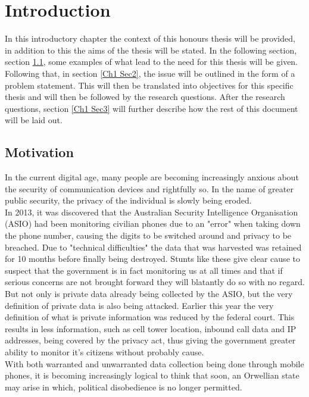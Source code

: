 
\chapter{Introduction} %

\label{Chapter 1} %

In this introductory chapter the context of this honours thesis will be provided, in addition to this the aims of the thesis will be stated. In the following section, section \ref{Ch1 Sec1}, some examples of what lead to the need for this thesis will be given. Following that, in section \ref{Ch1 Sec2}, the issue will be outlined in the form of a problem statement. This will then be translated into objectives for this specific thesis and will then be followed by the research questions. After the research questions, section \ref{Ch1 Sec3} will further describe how the rest of this document will be laid out.   


\section{Motivation}

\label{Ch1 Sec1}

In the current digital age, many people are becoming increasingly anxious about the security of communication devices and rightfully so. In the name of greater public security, the privacy of the individual is slowly being eroded.\\
In 2013, it was discovered that the Australian Security Intelligence Organisation (ASIO) had been monitoring civilian phones due to an "error" when taking down the phone number, causing the digits to be switched around and privacy to be breached. Due to "technical difficulties" the data that was harvested was retained for 10 months before finally being destroyed.\cite{Reference36} Stunts like these give clear cause to suspect that the government is in fact monitoring us at all times and that if serious concerns are not brought forward they will blatantly do so with no regard.\\
But not only is private data already being collected by the ASIO, but the very definition of private data is also being attacked. Earlier this year the very definition of what is private information was reduced by the federal court. This results in less information, such as cell tower location, inbound call data and IP addresses, being covered by the privacy act, thus giving the government greater ability to monitor it's citizens without probably cause.\cite{Reference37}\\
With both warranted and unwarranted data collection being done through mobile phones, it is becoming increasingly logical to think that soon, an Orwellian state may arise in which, political disobedience is no longer permitted.

